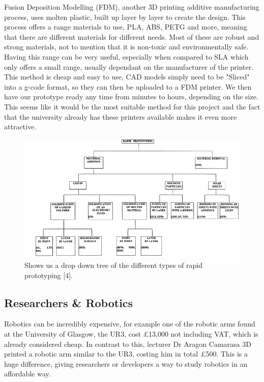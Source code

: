 \documentclass{l4proj}
\begin{document}
Fusion Deposition Modelling (FDM), another 3D printing additive manufacturing process, uses molten plastic, built up layer by layer to create the design. This process offers a range materials to use, PLA, ABS, PETG and more, meaning that there are different materials for different needs. Most of these are robust and strong materials, not to mention that it is non-toxic and environmentally safe. Having this range can be very useful, especially when compared to SLA which only offers a small range, usually dependant on the manufacturer of the printer. This method is cheap and easy to use, CAD models simply need to be "Sliced" into a g-code format, so they can then be uploaded to a FDM printer. We then have our prototype ready any time from minutes to hours, depending on the size. This seems like it would be the most suitable method for this project and the fact that the university already has these printers available makes it even more attractive. 

\begin{figure}[!ht]
    \centering
    \includegraphics[width=0.9\linewidth]{images/rapidPrototyping.png}    

    \caption{Shows us a drop down tree of the different types of rapid prototyping [4].}
\end{figure}


\subsection{Researchers \& Robotics}
Robotics can be incredibly expensive, for example one of the robotic arms found at the University of Glasgow, the UR3, cost £13,000 not including VAT, which is already considered cheap. In contrast to this, lecturer Dr Aragon Camarasa 3D printed a robotic arm similar to the UR3, costing him in total £500. This is a huge difference, giving researchers or developers a way to study robotics in an affordable way. 
\end{document}
